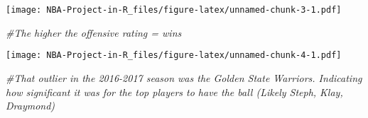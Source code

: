 \documentclass[
]{article}
\newenvironment{Shaded}{\begin{snugshade}}{\end{snugshade}}
\newcommand{\AttributeTok}[1]{\textcolor[rgb]{0.77,0.63,0.00}{#1}}
\newcommand{\CommentTok}[1]{\textcolor[rgb]{0.56,0.35,0.01}{\textit{#1}}}
\newcommand{\FloatTok}[1]{\textcolor[rgb]{0.00,0.00,0.81}{#1}}
\newcommand{\FunctionTok}[1]{\textcolor[rgb]{0.00,0.00,0.00}{#1}}
\newcommand{\NormalTok}[1]{#1}
\newcommand{\OtherTok}[1]{\textcolor[rgb]{0.56,0.35,0.01}{#1}}
\newcommand{\SpecialCharTok}[1]{\textcolor[rgb]{0.00,0.00,0.00}{#1}}
\newcommand{\StringTok}[1]{\textcolor[rgb]{0.31,0.60,0.02}{#1}}
\begin{document}
\texttt{[image: NBA-Project-in-R\_files/figure-latex/unnamed-chunk-3-1.pdf]}

\begin{Shaded}
\begin{Highlighting}[]
  \CommentTok{\#The higher the offensive rating = wins}
\end{Highlighting}
\end{Shaded}

\begin{Shaded}
\end{Shaded}

\texttt{[image: NBA-Project-in-R\_files/figure-latex/unnamed-chunk-4-1.pdf]}

\begin{Shaded}
\begin{Highlighting}[]
\CommentTok{\#That outlier in the 2016{-}2017 season was the Golden State Warriors. Indicating how significant it was for the top players to have the ball (Likely Steph, Klay, Draymond)}
\end{Highlighting}
\end{Shaded}
\end{document}
